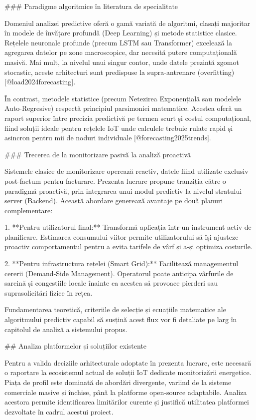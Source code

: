 ### Paradigme algoritmice în literatura de specialitate

Domeniul analizei predictive oferă o gamă variată de algoritmi, clasați
majoritar în modele de învățare profundă (Deep Learning) și metode
statistice clasice. Rețelele neuronale profunde (precum LSTM sau
Transformer) excelează la agregarea datelor pe zone macroscopice, dar
necesită putere computațională masivă. Mai mult, la nivelul unui singur
contor, unde datele prezintă zgomot stocastic, aceste arhitecturi sunt
predispuse la supra-antrenare (overfitting) [@load2024forecasting].

În contrast, metodele statistice (precum Netezirea Exponențială sau
modelele Auto-Regresive) respectă principiul parsimoniei matematice.
Acestea oferă un raport superior între precizia predictivă pe termen
scurt și costul computațional, fiind soluții ideale pentru rețelele IoT
unde calculele trebuie rulate rapid și asincron pentru mii de noduri
individuale [@forecasting2025trends].

### Trecerea de la monitorizare pasivă la analiză proactivă

Sistemele clasice de monitorizare operează reactiv, datele fiind
utilizate exclusiv post-factum pentru facturare. Prezenta lucrare
propune tranziția către o paradigmă proactivă, prin integrarea unui
modul predictiv la nivelul stratului server (Backend). Această abordare
generează avantaje pe două planuri complementare:

1.  **Pentru utilizatorul final:** Transformă aplicația într-un
    instrument activ de planificare. Estimarea consumului viitor permite
    utilizatorului să își ajusteze proactiv comportamentul pentru a
    evita tarifele de vârf și a-și optimiza costurile.

2.  **Pentru infrastructura rețelei (Smart Grid):** Facilitează
    managementul cererii (Demand-Side Management). Operatorul poate
    anticipa vârfurile de sarcină și congestiile locale înainte ca
    acestea să provoace pierderi sau suprasolicitări fizice în rețea.

Fundamentarea teoretică, criteriile de selecție și ecuațiile matematice
ale algoritmului predictiv capabil să susțină acest flux vor fi
detaliate pe larg în capitolul de analiză a sistemului propus.

## Analiza platformelor și soluțiilor existente

Pentru a valida deciziile arhitecturale adoptate în prezenta lucrare,
este necesară o raportare la ecosistemul actual de soluții IoT dedicate
monitorizării energetice. Piața de profil este dominată de abordări
divergente, variind de la sisteme comerciale masive și închise, până la
platforme open-source adaptabile. Analiza acestora permite identificarea
limitărilor curente și justifică utilitatea platformei dezvoltate în
cadrul acestui proiect.


